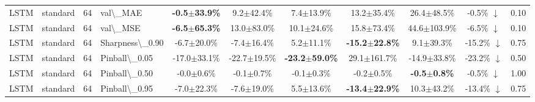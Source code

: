 \begin{table}[t]
\begin{tabular}{l l r l c c c c c c c}
LSTM & standard & 64 & val\textbackslash{}_MAE & \textbf{-0.5$\pm$33.9\%} & 9.2$\pm$42.4\% & 7.4$\pm$13.9\% & 13.2$\pm$35.4\% & 26.4$\pm$48.5\% & -0.5\% $\downarrow$ & 0.10 \\
LSTM & standard & 64 & val\textbackslash{}_MSE & \textbf{-6.5$\pm$65.3\%} & 13.0$\pm$83.0\% & 10.1$\pm$24.6\% & 15.8$\pm$73.4\% & 44.6$\pm$103.9\% & -6.5\% $\downarrow$ & 0.10 \\
LSTM & standard & 64 & Sharpness\textbackslash{}_0.90 & -6.7$\pm$20.0\% & -7.4$\pm$16.4\% & 5.2$\pm$11.1\% & \textbf{-15.2$\pm$22.8\%} & 9.1$\pm$39.3\% & -15.2\% $\downarrow$ & 0.75 \\
LSTM & standard & 64 & Pinball\textbackslash{}_0.05 & -17.0$\pm$33.1\% & -22.7$\pm$19.5\% & \textbf{-23.2$\pm$59.0\%} & 29.1$\pm$161.7\% & -14.9$\pm$33.8\% & -23.2\% $\downarrow$ & 0.50 \\
LSTM & standard & 64 & Pinball\textbackslash{}_0.50 & -0.0$\pm$0.6\% & -0.1$\pm$0.7\% & -0.1$\pm$0.3\% & -0.2$\pm$0.5\% & \textbf{-0.5$\pm$0.8\%} & -0.5\% $\downarrow$ & 1.00 \\
LSTM & standard & 64 & Pinball\textbackslash{}_0.95 & -7.0$\pm$22.3\% & -7.6$\pm$19.0\% & 5.5$\pm$13.6\% & \textbf{-13.4$\pm$22.9\%} & 10.3$\pm$43.2\% & -13.4\% $\downarrow$ & 0.75 \\
\bottomrule
\end{tabular}
\end{table}
